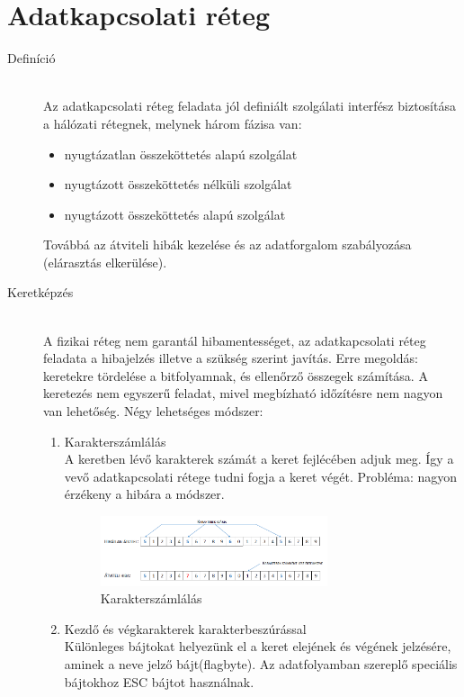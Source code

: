 \documentclass[margin=0px]{article}
\begin{document}
	\section{Adatkapcsolati réteg}
		\begin{description}
			\item[Definíció] \hfill \\
				Az adatkapcsolati réteg feladata jól definiált szolgálati interfész biztosítása a hálózati rétegnek, melynek három fázisa van:
				\begin{itemize}
					\item nyugtázatlan összeköttetés alapú szolgálat 
					\item nyugtázott összeköttetés nélküli szolgálat 
					\item nyugtázott összeköttetés alapú szolgálat 
				\end{itemize}
				Továbbá az átviteli hibák kezelése és az adatforgalom szabályozása (elárasztás elkerülése).
			\item[Keretképzés] \hfill \\
				A fizikai réteg nem garantál hibamentességet, az adatkapcsolati réteg feladata a hibajelzés illetve a szükség szerint javítás. Erre megoldás: keretekre tördelése a bitfolyamnak, és ellenőrző összegek számítása. A keretezés nem egyszerű feladat, mivel megbízható időzítésre nem nagyon van lehetőség. Négy lehetséges módszer:
				\begin{enumerate}
					\item Karakterszámlálás \\
						A keretben lévő karakterek számát a keret fejlécében adjuk meg. Így a vevő adatkapcsolati rétege tudni fogja a keret végét. Probléma: nagyon érzékeny a hibára a módszer.
						\begin{figure}[H]
							\centering
							\includegraphics[width=0.7\textwidth]{img/karakterszamlalas.png}
							\caption{Karakterszámlálás}	
						\end{figure}
					\item Kezdő és végkarakterek karakterbeszúrással \\
						Különleges bájtokat helyezünk el a keret elejének és végének jelzésére, aminek a neve jelző bájt(flagbyte). Az adatfolyamban szereplő speciális bájtokhoz ESC bájtot használnak.

\end{enumerate}
\end{description}
\end{document}

